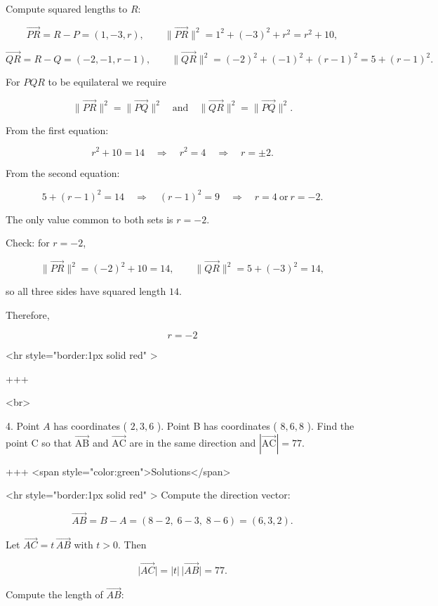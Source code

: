 Compute squared lengths to $R$:

$$
\overrightarrow{PR}=R-P=(1,-3,r),\qquad
\lVert\overrightarrow{PR}\rVert^2=1^2+(-3)^2+r^2=r^2+10,
$$


$$
\overrightarrow{QR}=R-Q=(-2,-1,r-1),\qquad
\lVert\overrightarrow{QR}\rVert^2=(-2)^2+(-1)^2+(r-1)^2=5+(r-1)^2.
$$

For $PQR$ to be equilateral we require

$$
\lVert\overrightarrow{PR}\rVert^2=\lVert\overrightarrow{PQ}\rVert^2
\quad\text{and}\quad
\lVert\overrightarrow{QR}\rVert^2=\lVert\overrightarrow{PQ}\rVert^2.
$$

From the first equation:

$$
r^2+10=14 \quad\Longrightarrow\quad r^2=4 \quad\Longrightarrow\quad r=\pm 2.
$$

From the second equation:

$$
5+(r-1)^2=14 \quad\Longrightarrow\quad (r-1)^2=9 \quad\Longrightarrow\quad r=4\ \text{or}\ r=-2.
$$

The only value common to both sets is $r=-2$.

Check: for $r=-2$,

$$
\lVert\overrightarrow{PR}\rVert^2 = (-2)^2+10=14,\qquad
\lVert\overrightarrow{QR}\rVert^2 = 5+(-3)^2=14,
$$

so all three sides have squared length $14$.

Therefore,

$$
r=-2
$$

<hr style="border:1px solid red" >

+++

<br>

4. Point $A$ has coordinates ( $2,3,6$ ). Point B has coordinates ( $8,6,8$ ). Find the point C so that $\overrightarrow{\mathrm{AB}}$ and $\overrightarrow{\mathrm{AC}}$ are in the same direction and $|\overrightarrow{\mathrm{AC}}|=77$.

+++ <span style="color:green">Solutions</span>

<hr style="border:1px solid red" >
Compute the direction vector:

$$
\overrightarrow{AB}=B-A=(8-2,\;6-3,\;8-6)=(6,3,2).
$$

Let $\overrightarrow{AC}=t\,\overrightarrow{AB}$ with $t>0$. Then

$$
\lvert\overrightarrow{AC}\rvert=|t|\,\lvert\overrightarrow{AB}\rvert=77.
$$

Compute the length of $\overrightarrow{AB}$:


